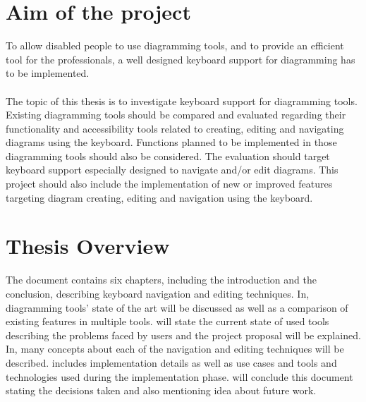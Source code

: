 \section{Aim of the project}
To allow disabled people to use diagramming tools, and to provide an efficient tool for the professionals, a well designed keyboard support for diagramming has to be implemented.

\paragraph{}
The topic of this thesis is to investigate keyboard support for diagramming tools.
Existing diagramming tools should be compared and evaluated regarding their functionality and accessibility tools related to creating, editing and navigating diagrams using the keyboard. Functions planned to be implemented in those diagramming tools should also be considered. The evaluation should target keyboard support especially designed to navigate and/or edit diagrams.
This project should also include the implementation of new or improved features targeting diagram creating, editing and navigation using the keyboard.

\section{Thesis Overview}
The document contains six chapters, including the introduction and the conclusion, describing keyboard navigation and editing techniques. In, diagramming tools' state of the art will be discussed as well as a comparison of existing features in multiple tools. will state the current state of used tools describing the problems faced by users and the project proposal will be explained. In, many concepts about each of the navigation and editing techniques will be described.  includes implementation details as well as use cases and tools and technologies used during the implementation phase. will conclude this document stating the decisions taken and also mentioning idea about future work.


